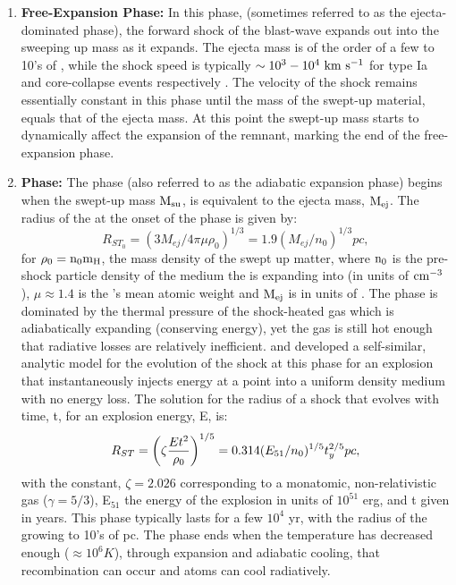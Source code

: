 \begin{enumerate}
	\item \textbf{ Free-Expansion Phase:} In this phase, (sometimes referred to as the ejecta-dominated phase), the forward shock of the blast-wave expands out into the \ism{} sweeping up mass as it expands. The ejecta mass is of the order of a few to 10's of \msun{}, while the shock speed is typically ${\rm \sim 10^3-10^4~ km~s^{-1}}$ for type Ia and core-collapse events respectively \cite{Reynolds08}. The velocity of the shock remains essentially constant in this phase until the mass of the swept-up material, equals that of the ejecta mass.
	At this point the swept-up mass starts to dynamically affect the expansion of the remnant, marking the end of the free-expansion phase.
	
	\item \textbf{\sedt{} Phase:} The \sedt{} phase (also referred to as the adiabatic expansion phase) begins when the swept-up mass ${\rm M_{su}}$, is equivalent to the ejecta mass, ${\rm M_{ej}}$. The radius of the \snr{} at the onset of the \sedt{} phase is given by:
	\begin{equation}
	R_{ST_0} = (3M_{ej}/4\pi \mu \rho_0)^{1/3} = 1.9(M_{ej}/n_0)^{1/3} pc,
	\end{equation}
	for ${\rm \rho_0 = n_0m_H}$, the mass density of the swept up matter, where 
	${\rm n_0}$ is the pre-shock particle density of the medium the \snr{} is expanding into (in units of ${\rm cm^{-3}}$), $\mu\approx1.4$ is the \ism{}'s mean atomic weight and ${\rm M_{ej}}$ is in units of \msun{}. The \sedt{} phase is dominated by the thermal pressure of the shock-heated gas which is adiabatically expanding (conserving energy), yet the gas is still hot enough that radiative losses are relatively inefficient. \cite{1959sdmm.book.....S} and \cite{Taylor50} developed a self-similar, analytic model for the evolution of the shock at this phase for an explosion that instantaneously injects energy at a point into a uniform density medium with no energy loss. The \sedt{} solution for the radius of a shock that evolves with time, t, for an explosion energy, E, is:
	\begin{equation}
	R_{ST} = \bigg{(}\zeta \frac{Et^2}{\rho_0} \bigg{)}^{{1/5}} = 0.314(E_{51}/n_0)^{1/5}t_{y}^{2/5} pc,
	\end{equation}
	with the constant, $\zeta = 2.026$ corresponding to a monatomic, non-relativistic  gas ($\gamma = 5/3$), E$_{51}$ the energy of the explosion in units of $10^{51}$ erg, and t given in years. This phase typically lasts for a few $10^4$ yr, with the radius of the \snr{} growing to 10's of pc. The \sedt{} phase ends when the temperature has decreased enough ($\approx 10^6 K$), through expansion and adiabatic cooling, that recombination can occur and atoms can cool radiatively.
	

\end{enumerate}
